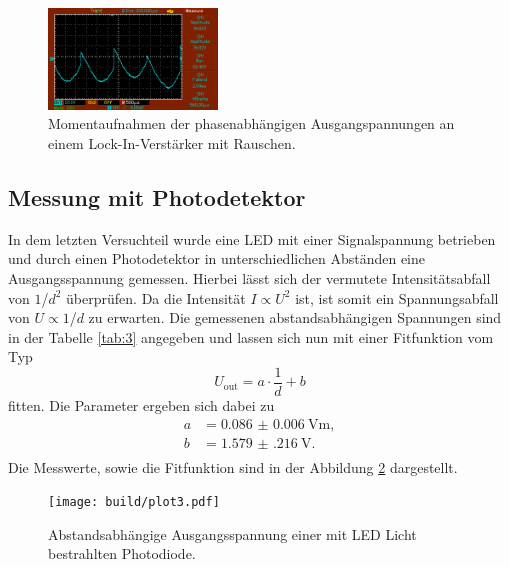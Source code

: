 \begin{figure}
\begin{minipage}{0.5\textwidth}
        \caption{$\phi = \SI{300}{\degree}$.} 
        \label{fig:26}
    \end{minipage}
    \vspace{1cm}
    \vfill
        \centering
        \includegraphics[width=0.4\textwidth]{bilder/360mit.png}
        \caption{$\phi = \SI{360}{\degree}$.} 
        \label{fig:27}
    \caption{Momentaufnahmen der phasenabhängigen Ausgangspannungen an einem Lock-In-Verstärker mit Rauschen.}
\end{figure}

\subsection{Messung mit Photodetektor}
In dem letzten Versuchteil wurde eine LED mit einer Signalspannung betrieben und durch einen Photodetektor in unterschiedlichen Abständen eine Ausgangsspannung gemessen.
Hierbei lässt sich der vermutete Intensitätsabfall von $1$/$d^2$ überprüfen. Da die Intensität $I \propto U^2$ ist, ist somit ein Spannungsabfall von $U \propto 1$/$d$ zu erwarten.
Die gemessenen abstandsabhängigen Spannungen sind in der Tabelle \ref{tab:3} angegeben und lassen sich nun mit einer Fitfunktion vom Typ
\begin{equation}
U_{\text{out}} = a \cdot \frac{1}{d} + b
\end{equation}
fitten. Die Parameter ergeben sich dabei zu
\begin{align*}
    a &= \SI{ 0.086(6)}{\volt\meter},\\
    b &= \SI{1.579(216)}{\volt}.\\
\end{align*}
Die Messwerte, sowie die Fitfunktion sind in der Abbildung \ref{fig:licht123} dargestellt.
\begin{figure}
    \centering
    \texttt{[image: build/plot3.pdf]}
    \caption{Abstandsabhängige Ausgangsspannung einer mit LED Licht bestrahlten Photodiode.} 
    \label{fig:licht123}
\end{figure}